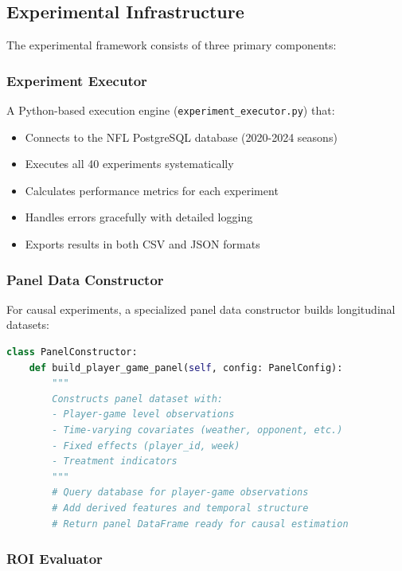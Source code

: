 \subsection{Experimental Infrastructure}

The experimental framework consists of three primary components:

\subsubsection{Experiment Executor}

A Python-based execution engine (\texttt{experiment\_executor.py}) that:
\begin{itemize}
    \item Connects to the NFL PostgreSQL database (2020-2024 seasons)
    \item Executes all 40 experiments systematically
    \item Calculates performance metrics for each experiment
    \item Handles errors gracefully with detailed logging
    \item Exports results in both CSV and JSON formats
\end{itemize}

\subsubsection{Panel Data Constructor}

For causal experiments, a specialized panel data constructor builds longitudinal datasets:

\begin{lstlisting}[language=Python, caption={Panel Data Construction for Causal Analysis}]
class PanelConstructor:
    def build_player_game_panel(self, config: PanelConfig):
        """
        Constructs panel dataset with:
        - Player-game level observations
        - Time-varying covariates (weather, opponent, etc.)
        - Fixed effects (player_id, week)
        - Treatment indicators
        """
        # Query database for player-game observations
        # Add derived features and temporal structure
        # Return panel DataFrame ready for causal estimation
\end{lstlisting}

\subsubsection{ROI Evaluator}

